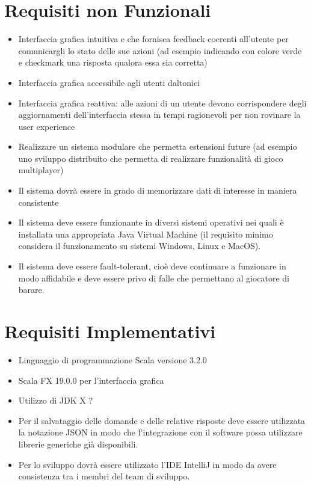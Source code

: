 	\section{Requisiti non Funzionali}
        \begin{itemize}
            \item Interfaccia grafica intuitiva e che fornisca feedback coerenti all'utente per comunicargli lo stato delle sue azioni (ad esempio indicando con colore verde e checkmark una risposta qualora essa sia corretta)
            \item Interfaccia grafica accessibile agli utenti daltonici
            \item Interfaccia grafica reattiva: alle azioni di un utente devono corrispondere degli aggiornamenti dell'interfaccia stessa in tempi ragionevoli per non rovinare la user experience
            \item Realizzare un sistema modulare che permetta estensioni future (ad esempio uno sviluppo distribuito che permetta di realizzare funzionalità di gioco multiplayer)
            \item Il sistema dovrà essere in grado di memorizzare dati di interesse in maniera consistente
            \item Il sistema deve essere funzionante in diversi sistemi operativi nei quali è installata una appropriata Java Virtual Machine (il requisito minimo considera il funzionamento su sistemi Windows, Linux e MacOS).
            \item Il sistema deve essere fault-tolerant, cioè deve continuare a funzionare in modo affidabile e deve essere privo di falle che permettano al giocatore di barare.
        
        \end{itemize}

	\section{Requisiti Implementativi}
        \begin{itemize}
            \item Linguaggio di programmazione Scala versione 3.2.0
            \item Scala FX 19.0.0 per l'interfaccia grafica
            \item Utilizzo di JDK X ?
            \item Per il salvataggio delle domande e delle relative risposte deve essere utilizzata la notazione JSON in modo che l'integrazione con il software possa utilizzare librerie generiche già disponibili.
            \item Per lo sviluppo dovrà essere utilizzato l'IDE IntelliJ in modo da avere consistenza tra i membri del team di sviluppo.
        \end{itemize}

	